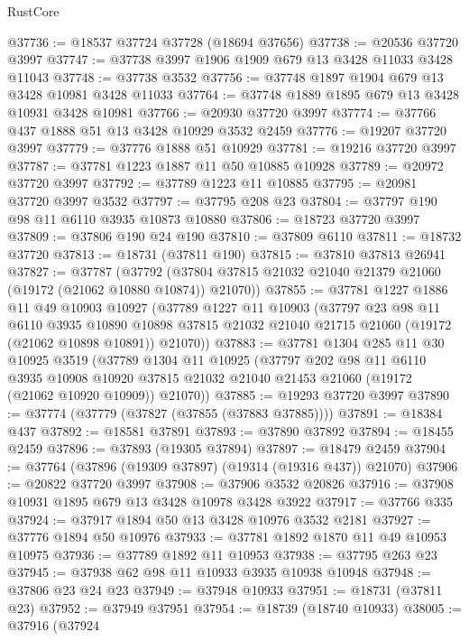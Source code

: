 \begin{lexlean}{RustCore}
\begin{coremodule}
@37736 := @18537 @37724 @37728 (@18694 @37656)
@37738 := @20536 @37720 @3997
@37747 := @37738 @3997 @1906 @1909 @679 @13 @3428 @11033 @3428 @11043
@37748 := @37738 @3532
@37756 := @37748 @1897 @1904 @679 @13 @3428 @10981 @3428 @11033
@37764 := @37748 @1889 @1895 @679 @13 @3428 @10931 @3428 @10981
@37766 := @20930 @37720 @3997
@37774 := @37766 @437 @1888 @51 @13 @3428 @10929 @3532 @2459
@37776 := @19207 @37720 @3997
@37779 := @37776 @1888 @51 @10929
@37781 := @19216 @37720 @3997
@37787 := @37781 @1223 @1887 @11 @50 @10885 @10928
@37789 := @20972 @37720 @3997
@37792 := @37789 @1223 @11 @10885
@37795 := @20981 @37720 @3997 @3532
@37797 := @37795 @208 @23
@37804 := @37797 @190 @98 @11 @6110 @3935 @10873 @10880
@37806 := @18723 @37720 @3997
@37809 := @37806 @190 @24 @190
@37810 := @37809 @6110
@37811 := @18732 @37720
@37813 := @18731 (@37811 @190)
@37815 := @37810 @37813 @26941
@37827 := @37787
    (@37792 (@37804 @37815 @21032 @21040 @21379 @21060 (@19172 (@21062 @10880 @10874)) @21070))
@37855 := @37781
    @1227
    @1886
    @11
    @49
    @10903
    @10927
    (@37789
      @1227
      @11
      @10903
      (@37797
        @23
        @98
        @11
        @6110
        @3935
        @10890
        @10898
        @37815
        @21032
        @21040
        @21715
        @21060
        (@19172 (@21062 @10898 @10891))
        @21070))
@37883 := @37781
    @1304
    @285
    @11
    @30
    @10925
    @3519
    (@37789
      @1304
      @11
      @10925
      (@37797
        @202
        @98
        @11
        @6110
        @3935
        @10908
        @10920
        @37815
        @21032
        @21040
        @21453
        @21060
        (@19172 (@21062 @10920 @10909))
        @21070))
@37885 := @19293 @37720 @3997
@37890 := @37774 (@37779 (@37827 (@37855 (@37883 @37885))))
@37891 := @18384 @437
@37892 := @18581 @37891
@37893 := @37890 @37892
@37894 := @18455 @2459
@37896 := @37893 (@19305 @37894)
@37897 := @18479 @2459
@37904 := @37764 (@37896 (@19309 @37897) (@19314 (@19316 @437)) @21070)
@37906 := @20822 @37720 @3997
@37908 := @37906 @3532 @20826
@37916 := @37908 @10931 @1895 @679 @13 @3428 @10978 @3428 @3922
@37917 := @37766 @335
@37924 := @37917 @1894 @50 @13 @3428 @10976 @3532 @2181
@37927 := @37776 @1894 @50 @10976
@37933 := @37781 @1892 @1870 @11 @49 @10953 @10975
@37936 := @37789 @1892 @11 @10953
@37938 := @37795 @263 @23
@37945 := @37938 @62 @98 @11 @10933 @3935 @10938 @10948
@37948 := @37806 @23 @24 @23
@37949 := @37948 @10933
@37951 := @18731 (@37811 @23)
@37952 := @37949 @37951
@37954 := @18739 (@18740 @10933)
@38005 := @37916
    (@37924

\end{coremodule}
\end{lexlean}
